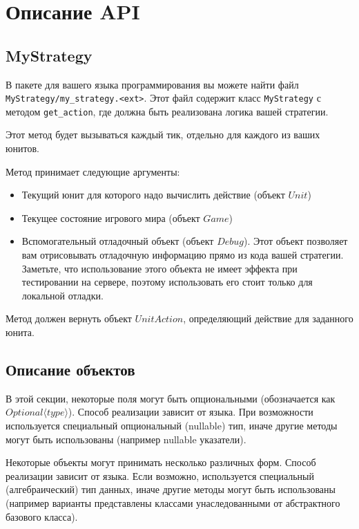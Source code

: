 \chapter{Описание API}

\section{MyStrategy}

В пакете для вашего языка программирования вы можете найти файл \texttt{MyStrategy/my\_strategy.<ext>}.
Этот файл содержит класс \texttt{MyStrategy} с методом \texttt{get\_action}, где должна быть реализована логика вашей стратегии.

Этот метод будет вызываться каждый тик, отдельно для каждого из ваших юнитов.

Метод принимает следующие аргументы:

\begin{itemize}
    \item Текущий юнит для которого надо вычислить действие (объект $Unit$)
    \item Текущее состояние игрового мира (объект $Game$)
    \item Вспомогательный отладочный объект (объект $Debug$).
        Этот объект позволяет вам отрисовывать отладочную информацию прямо из кода вашей стратегии.
        Заметьте, что использование этого объекта не имеет эффекта при тестировании на сервере,
        поэтому использовать его стоит только для локальной отладки.
\end{itemize}

Метод должен вернуть объект $UnitAction$, определяющий действие для заданного юнита.

\section{Описание объектов}

В этой секции, некоторые поля могут быть опциональными (обозначается как $Optional \langle type \rangle$).
Способ реализации зависит от языка.
При возможности используется специальный опциональный (nullable) тип,
иначе другие методы могут быть использованы (например nullable указатели).

Некоторые объекты могут принимать несколько различных форм. Способ реализации зависит от языка.
Если возможно, используется специальный (алгебраический) тип данных,
иначе другие методы могут быть использованы (например варианты представлены классами унаследованными от абстрактного базового класса).

